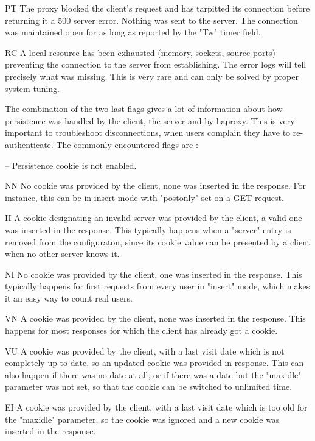      PT   The proxy blocked the client's request and has tarpitted its
          connection before returning it a 500 server error. Nothing was sent
          to the server. The connection was maintained open for as long as
          reported by the "Tw" timer field.

     RC   A local resource has been exhausted (memory, sockets, source ports)
          preventing the connection to the server from establishing. The error
          logs will tell precisely what was missing. This is very rare and can
          only be solved by proper system tuning.

The combination of the two last flags gives a lot of information about how
persistence was handled by the client, the server and by haproxy. This is very
important to troubleshoot disconnections, when users complain they have to
re-authenticate. The commonly encountered flags are :

     --   Persistence cookie is not enabled.

     NN   No cookie was provided by the client, none was inserted in the
          response. For instance, this can be in insert mode with "postonly"
          set on a GET request.

     II   A cookie designating an invalid server was provided by the client,
          a valid one was inserted in the response. This typically happens when
          a "server" entry is removed from the configuraton, since its cookie
          value can be presented by a client when no other server knows it.

     NI   No cookie was provided by the client, one was inserted in the
          response. This typically happens for first requests from every user
          in "insert" mode, which makes it an easy way to count real users.

     VN   A cookie was provided by the client, none was inserted in the
          response. This happens for most responses for which the client has
          already got a cookie.

     VU   A cookie was provided by the client, with a last visit date which is
          not completely up-to-date, so an updated cookie was provided in
          response. This can also happen if there was no date at all, or if
          there was a date but the "maxidle" parameter was not set, so that the
          cookie can be switched to unlimited time.

     EI   A cookie was provided by the client, with a last visit date which is
          too old for the "maxidle" parameter, so the cookie was ignored and a
          new cookie was inserted in the response.

